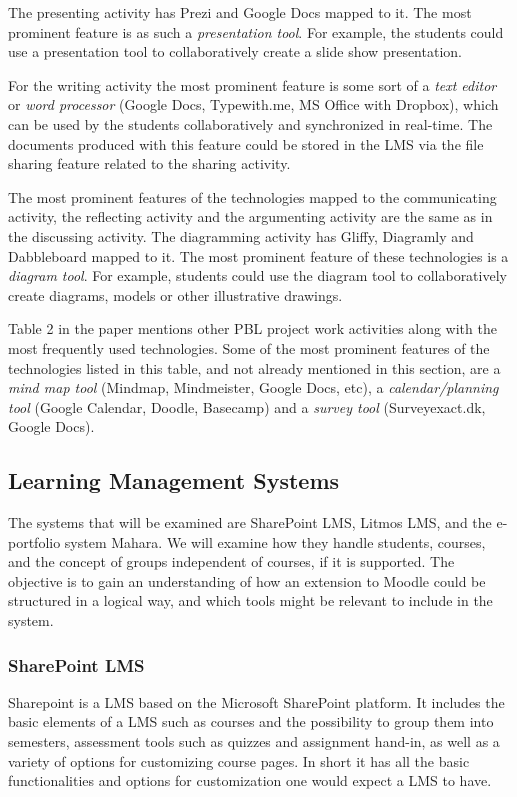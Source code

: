 The presenting activity has Prezi and Google Docs mapped to it. The most prominent feature is as such a \textit{presentation tool}.
For example, the students could use a presentation tool to collaboratively create a slide show presentation.

For the writing activity the most prominent feature is some sort of a \textit{text editor} or \textit{word processor} (Google Docs, Typewith.me, MS Office with Dropbox), which can be used by the students collaboratively and synchronized in real-time.
The documents produced with this feature could be stored in the LMS via the file sharing feature related to the sharing activity.

The most prominent features of the technologies mapped to the communicating activity, the reflecting activity and the argumenting activity are the same as in the discussing activity.
The diagramming activity has Gliffy, Diagramly and Dabbleboard mapped to it.
The most prominent feature of these technologies is a \textit{diagram tool}.
For example, students could use the diagram tool to collaboratively create diagrams, models or other illustrative drawings.

Table 2 in the paper mentions other PBL project work activities along with the most frequently used technologies.
Some of the most prominent features of the technologies listed in this table, and not already mentioned in this section, are a \textit{mind map tool} (Mindmap, Mindmeister, Google Docs, etc), a \textit{calendar/planning tool} (Google Calendar, Doodle, Basecamp) and a \textit{survey tool} (Surveyexact.dk, Google Docs).


\subsection{Learning Management Systems}
The systems that will be examined are SharePoint LMS, Litmos LMS, and the e-portfolio system Mahara.
We will examine how they handle students, courses, and the concept of groups independent of courses, if it is supported.
The objective is to gain an understanding of how an extension to Moodle could be structured in a logical way, and which tools might be relevant to include in the system.

\subsubsection{SharePoint LMS} 
Sharepoint \citep{sharepoint1,sharepoint2} is a LMS based on the Microsoft SharePoint platform. 
It includes the basic elements of a LMS such as courses and the possibility to group them into semesters, assessment tools such as quizzes and assignment hand-in, as well as a variety of options for customizing course pages.
In short it has all the basic functionalities and options for customization one would expect a LMS to have.

